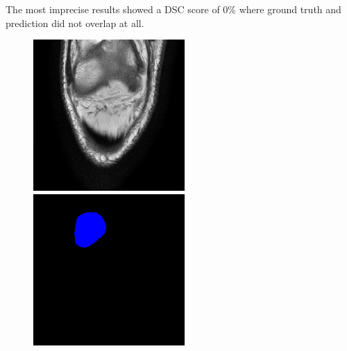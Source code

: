 The most imprecise results showed a DSC score of 0\% where ground truth and prediction did not overlap at all.

\begin{figure}[H]
  \includegraphics[width=\linewidth]{imgs/a8.png}
\endminipage\hfill
{}
  \includegraphics[width=\linewidth]{imgs/b8.png}

\end{figure}
